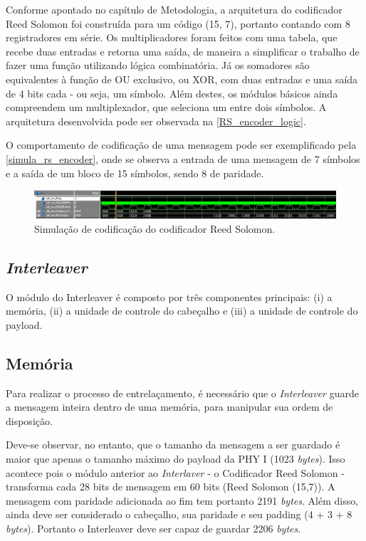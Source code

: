 	Conforme apontado no capítulo de Metodologia, a arquitetura do codificador Reed Solomon foi construída para um código (15, 7), portanto contando com 8 registradores em série. Os multiplicadores foram feitos com uma tabela,  que recebe duas entradas e retorna uma saída, de maneira a simplificar o trabalho de fazer uma função utilizando lógica combinatória. Já os somadores são equivalentes à função de OU exclusivo, ou XOR, com duas entradas e uma saída de 4 bits cada - ou seja, um símbolo. Além destes, os módulos básicos ainda compreendem um multiplexador, que seleciona um entre dois símbolos. A arquitetura desenvolvida pode ser observada na \autoref{RS_encoder_logic}.
	
	O comportamento de codificação de uma mensagem pode ser exemplificado pela \autoref{simula_rs_encoder}, onde se observa a entrada de uma mensagem de 7 símbolos e a saída de um bloco de 15 símbolos, sendo 8 de paridade.
	
	\begin{figure}[htb]
		\caption{\label{simula_rs_encoder}Simulação de codificação do codificador Reed Solomon.}
		\centering
		\includegraphics[width=1\textwidth]{RS/Sim_encoder}
	\end{figure}
	
	\subsection{\textit{Interleaver}}

	O módulo do Interleaver é composto por três componentes principais: (i) a memória, (ii) a unidade de controle do cabeçalho e (iii) a unidade de controle do payload.

	\subsection{Memória}
	
	Para realizar o processo de entrelaçamento, é necessário que o \textit{Interleaver} guarde a mensagem inteira dentro de uma memória, para manipular sua ordem de disposição. 
	
	Deve-se observar, no entanto, que o tamanho da mensagem a ser guardado é maior que apenas o tamanho máximo do payload da PHY I (1023 \textit{bytes}). Isso acontece pois o módulo anterior ao \textit{Interlaver} - o Codificador Reed Solomon - transforma cada 28 bits de mensagem em 60 bits (Reed Solomon (15,7)). A mensagem com paridade adicionada ao fim tem portanto 2191 \textit{bytes}. Além disso, ainda deve ser considerado o cabeçalho, sua paridade e seu padding (4 + 3 + 8 \textit{bytes}). Portanto o Interleaver deve ser capaz de guardar 2206 \textit{bytes}.
	
